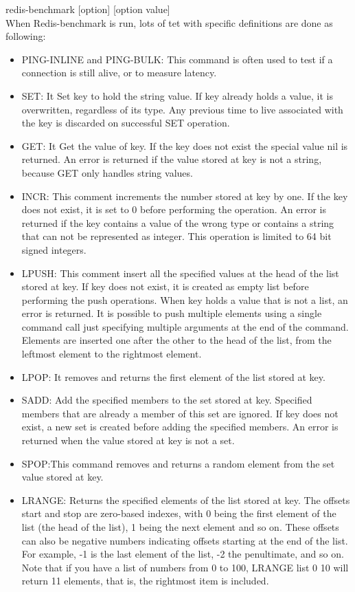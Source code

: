 \documentclass[10pt, conference]{IEEEtran}
\begin{document}
\indent redis-benchmark [option] [option value]\\

\indent When Redis-benchmark is run, lots of tet with specific definitions are done as following:

\begin{itemize}

\item PING-INLINE and PING-BULK: This command is often used to test if a connection is still alive, or to measure latency.
\item SET: It Set key to hold the string value. If key already holds a value, it is overwritten, regardless of its type. Any previous time to live associated with the key is discarded on successful SET operation.
\item GET: It Get the value of key. If the key does not exist the special value nil is returned. An error is returned if the value stored at key is not a string, because GET only handles string values.
\item INCR: This comment increments the number stored at key by one. If the key does not exist, it is set to 0 before performing the operation. An error is returned if the key contains a value of the wrong type or contains a string that can not be represented as integer. This operation is limited to 64 bit signed integers.
\item LPUSH: This comment insert all the specified values at the head of the list stored at key. If key does not exist, it is created as empty list before performing the push operations. When key holds a value that is not a list, an error is returned.
It is possible to push multiple elements using a single command call just specifying multiple arguments at the end of the command. Elements are inserted one after the other to the head of the list, from the leftmost element to the rightmost element.
\item LPOP: It removes and returns the first element of the list stored at key.
\item SADD: Add the specified members to the set stored at key. Specified members that are already a member of this set are ignored. If key does not exist, a new set is created before adding the specified members. An error is returned when the value stored at key is not a set.
\item SPOP:This command removes and returns a random element from the set value stored at key.
\item LRANGE: Returns the specified elements of the list stored at key. The offsets start and stop are zero-based indexes, with 0 being the first element of the list (the head of the list), 1 being the next element and so on. These offsets can also be negative numbers indicating offsets starting at the end of the list. For example, -1 is the last element of the list, -2 the penultimate, and so on. Note that if you have a list of numbers from 0 to 100, LRANGE list 0 10 will return 11 elements, that is, the rightmost item is included.

\end{itemize}
\end{document}
